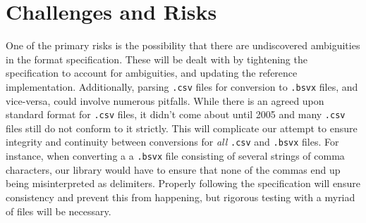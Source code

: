 \documentclass[10pt]{article}
\begin{document}
\begin{table}[H]
\centering
{}
\caption{Purported project schedule.}
\label{tab:approach_schedule}
\end{table}

\section*{Challenges and Risks}

One of the primary risks is the possibility that there are undiscovered ambiguities in the format specification.
These will be dealt with by tightening the specification to account for ambiguities, and updating the reference implementation.
Additionally, parsing \texttt{.csv} files for conversion to \texttt{.bsvx} files, and vice-versa, could involve numerous pitfalls.
While there is an agreed upon standard format for \texttt{.csv} files, it didn’t come about until 2005 and many \texttt{.csv} files still do not conform to it strictly.
This will complicate our attempt to ensure integrity and continuity between conversions for \textit{all} \texttt{.csv} and \texttt{.bsvx} files.
For instance, when converting a a \texttt{.bsvx} file consisting of several strings of comma characters, our library would have to ensure that none of the commas end up being misinterpreted as delimiters.
Properly following the specification will ensure consistency and prevent this from happening, but rigorous testing with a myriad of files will be necessary.
\end{document}
